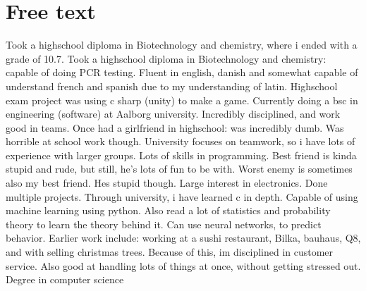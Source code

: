 \section*{Free text}
Took a highschool diploma in Biotechnology and chemistry, where i ended with a grade of 10.7.
Took a highschool diploma in Biotechnology and chemistry: capable of doing PCR testing.
Fluent in english, danish and somewhat capable of understand french and spanish due to my understanding of latin.
Highschool exam project was using c sharp (unity) to make a game.
Currently doing a bsc in engineering (software) at Aalborg university.
Incredibly disciplined, and work good in teams.
Once had a girlfriend in highschool: was incredibly dumb. Was horrible at school work though.
University focuses on teamwork, so i have lots of experience with larger groups.
Lots of skills in programming.
Best friend is kinda stupid and rude, but still, he's lots of fun to be with.
Worst enemy is sometimes also my best friend. Hes stupid though.
Large interest in electronics. Done multiple projects.
Through university, i have learned c in depth.
Capable of using machine learning using python. Also read a lot of statistics and probability theory to learn the theory behind it. Can use neural networks, to predict behavior.
Earlier work include: working at a sushi restaurant, Bilka, bauhaus, Q8, and with selling christmas trees. Because of this, im disciplined in customer service.
Also good at handling lots of things at once, without getting stressed out.
Degree in computer science

